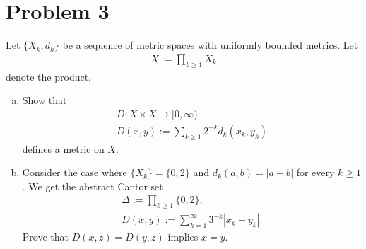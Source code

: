 \documentclass[8pt]{extarticle}
\begin{document}
  \section{Problem 3}%
  Let $\{X_k,d_k\}$ be a sequence of metric spaces with uniformly bounded metrics. Let
  \begin{align*}
    X := \prod_{k\geq 1} X_k
  \end{align*}
  denote the product.
  \begin{enumerate}[(a)]
    \item Show that
      \begin{align*}
        D: X\times X \rightarrow [0,\infty)\\
        D(x,y) := \sum_{k\geq1}2^{-k}d_k(x_k,y_k)
      \end{align*}
      defines a metric on $X$.
    \item Consider the case where $\{X_k\} = \{0,2\}$ and $d_k(a,b) = |a-b|$ for every $k\geq 1$. We get the abstract Cantor set
      \begin{align*}
        \Delta := \prod_{k\geq 1} \{0,2\};\\
        D(x,y) := \sum_{k=1}^{\infty}3^{-k}|x_k - y_k|.
      \end{align*}
      Prove that $D(x,z) = D(y,z)$ implies $x=y$.
  \end{enumerate}
\end{document}
